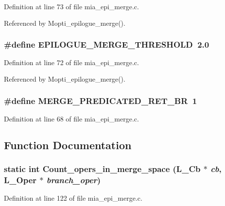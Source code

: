 Definition at line 73 of file mia\_\-epi\_\-merge.c.

Referenced by Mopti\_\-epilogue\_\-merge().
\subsubsection{\setlength{\rightskip}{0pt plus 5cm}\#define EPILOGUE\_\-MERGE\_\-THRESHOLD~2.0}\label{mia__epi__merge_8c_d26a5a3e43e6c68684df7cb957bf1946}




Definition at line 72 of file mia\_\-epi\_\-merge.c.

Referenced by Mopti\_\-epilogue\_\-merge().
\subsubsection{\setlength{\rightskip}{0pt plus 5cm}\#define MERGE\_\-PREDICATED\_\-RET\_\-BR~1}\label{mia__epi__merge_8c_d26cdef0d2a5151acf14675af2711551}




Definition at line 68 of file mia\_\-epi\_\-merge.c.

\subsection{Function Documentation}
\subsubsection{\setlength{\rightskip}{0pt plus 5cm}static int Count\_\-opers\_\-in\_\-merge\_\-space (L\_\-Cb $\ast$ {\em cb}, L\_\-Oper $\ast$ {\em branch\_\-oper})\hspace{0.3cm}{\tt  [static]}}\label{mia__epi__merge_8c_e51b4f844e8db816853f396e53840f12}




Definition at line 122 of file mia\_\-epi\_\-merge.c.

